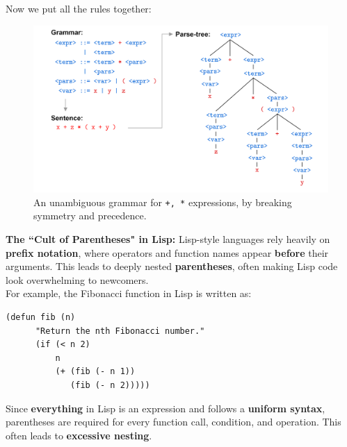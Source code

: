\noindent
Now we put all the rules together:
\begin{figure}[h]
    \centering
    \includegraphics[width=1\textwidth]{Sections/Formal/amb6.png}
    \caption{An unambiguous grammar for \texttt{+, *} expressions, by breaking symmetry and precedence.}
    \label{fig:amb6}
\end{figure}

\begin{Tip} \textbf{The ``Cult of Parentheses" in Lisp:} Lisp-style languages rely heavily on \textbf{prefix notation}, where operators and function names appear \textbf{before} their arguments. This leads to deeply nested \textbf{parentheses}, often making Lisp code look overwhelming to newcomers.\\
    
    \noindent
    For example, the Fibonacci function in Lisp is written as:
    
    \begin{lstlisting}[numbers=none]
    (defun fib (n)
      "Return the nth Fibonacci number."
      (if (< n 2)
          n
          (+ (fib (- n 1))
             (fib (- n 2)))))
    \end{lstlisting}
    
    \noindent
    Since \textbf{everything} in Lisp is an expression and follows a \textbf{uniform syntax}, parentheses are required for every function call, condition, and operation. This often leads to \textbf{excessive nesting}.
    
    \end{Tip}
    
    